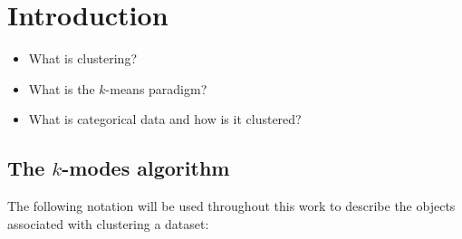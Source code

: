 \section{Introduction}\label{sec:intro}

\begin{itemize}
    \item What is clustering?
    \item What is the \(k\)-means paradigm?
    \item What is categorical data and how is it clustered?
\end{itemize}

\subsection{The \(k\)-modes algorithm}\label{subsec:kmodes}

The following notation will be used throughout this work to describe the objects
associated with clustering a dataset:

